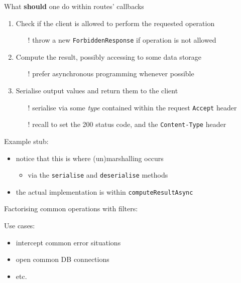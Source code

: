 \documentclass[presentation]{beamer}\mode<presentation>{\usetheme{AMSBolognaFC}}
\begin{document}
\begin{frame}[allowframebreaks]
\begin{block}{What \textbf{should} one do within routes' callbacks}
\begin{enumerate}
            \item Check if the client \alert{is allowed} to perform the requested operation
            \begin{itemize}
                \item[!] throw a new \texttt{ForbiddenResponse} if operation is not allowed
            \end{itemize}

            \item Compute the result, possibly accessing to some data storage
            \begin{itemize}
                \item[!] prefer asynchronous programming whenever possible
            \end{itemize}

            \item \alert{Serialise} output values and return them to the client
            \begin{itemize}
                \item[!] serialise via some \emph{type} contained within the request \texttt{Accept} header
                \item[!] recall to set the 200 status code, and the \texttt{Content-Type} header
            \end{itemize}
        \end{enumerate}
    \end{block}

    \framebreak

    Example stub:
    
    \begin{itemize}
        \item notice that this is where \alert{(un)marshalling} occurs
        \begin{itemize}
            \item via the \texttt{serialise} and \texttt{deserialise} methods
        \end{itemize}

        \item the actual implementation is within \texttt{computeResultAsync}
    \end{itemize}

    \framebreak

    Factorising common operations with \alert{filters}:
    
    Use cases:
    \begin{itemize}
        \item intercept common error situations
        \item open common DB connections
        \item etc.
    \end{itemize}

\end{frame}
\end{document}
